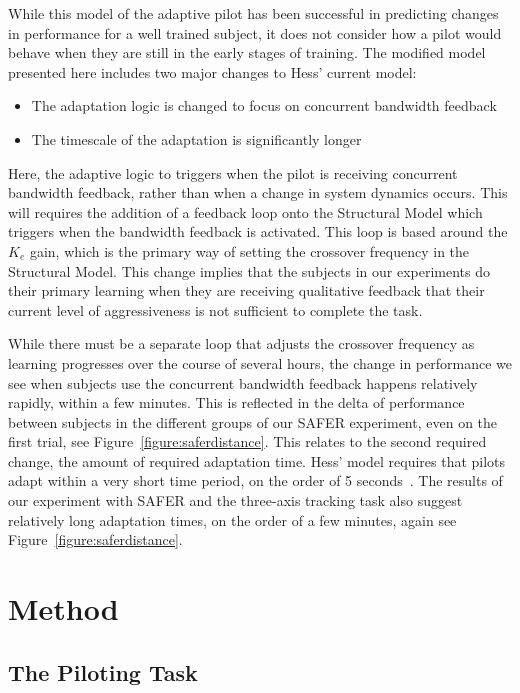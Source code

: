 While this model of the adaptive pilot has been successful in predicting changes in performance for a well trained subject, it does not consider how a pilot would behave when they are still in the early stages of training.
The modified model presented here includes two major changes to Hess' current model:
\begin{itemize}
    \item The adaptation logic is changed to focus on concurrent bandwidth feedback
    \item The timescale of the adaptation is significantly longer
\end{itemize}

Here, the adaptive logic to triggers when the pilot is receiving concurrent bandwidth feedback, rather than when a change in system dynamics occurs.
This will requires the addition of a feedback loop onto the Structural Model which triggers when the bandwidth feedback is activated.
This loop is based around the $K_e$ gain, which is the primary way of setting the crossover frequency in the Structural Model.
This change implies that the subjects in our experiments do their primary learning when they are receiving qualitative feedback that their current level of aggressiveness is not sufficient to complete the task.

While there must be a separate loop that adjusts the crossover frequency as learning progresses over the course of several hours, the change in performance we see when subjects use the concurrent bandwidth feedback happens relatively rapidly, within a few minutes.
This is reflected in the delta of performance between subjects in the different groups of our SAFER experiment, even on the first trial, see Figure~\ref{figure:saferdistance}.
This relates to the second required change, the amount of required adaptation time.
Hess' model requires that pilots adapt within a very short time period, on the order of 5 seconds~\citep{weir_model_1966}.
The results of our experiment with SAFER and the three-axis tracking task also suggest relatively long adaptation times, on the order of a few minutes, again see Figure~\ref{figure:saferdistance}.

\section{Method}

\subsection{The Piloting Task}

